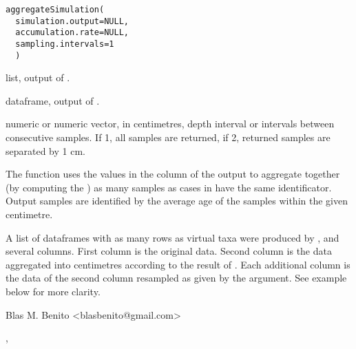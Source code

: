 \documentclass[letterpaper]{book}
\begin{document}
%
\begin{Usage}
\begin{verbatim}
aggregateSimulation(
  simulation.output=NULL,
  accumulation.rate=NULL,
  sampling.intervals=1
  )
\end{verbatim}
\end{Usage}
%
\begin{Arguments}
\begin{ldescription}
\item[\code{simulation.output}] list, output of .

\item[\code{accumulation.rate}] dataframe, output of .

\item[\code{sampling.intervals}] numeric or numeric vector, in centimetres, depth interval or intervals between consecutive samples. If 1, all samples are returned, if 2, returned samples are separated by 1 cm.
\end{ldescription}
\end{Arguments}
%
\begin{Details}\relax
The function uses the values in the  column of the  output to aggregate together (by computing the ) as many samples as cases in  have the same identificator. Output samples are identified by the average age of the samples within the given centimetre.
\end{Details}
%
\begin{Value}
A list of dataframes with as many rows as virtual taxa were produced by , and several columns. First column is the original data. Second column is the data aggregated into centimetres according to the result of . Each additional column is the data of the second column resampled as given by the  argument. See example below for more clarity.
\end{Value}
%
\begin{Author}\relax
Blas M. Benito  <blasbenito@gmail.com>
\end{Author}
%
\begin{SeeAlso}\relax
{}, 
\end{SeeAlso}
\end{document}
